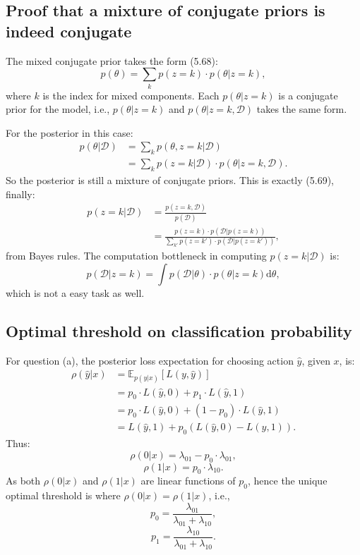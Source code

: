 \documentclass[UTF8]{ctexart}
\begin{document}
\subsection{Proof that a mixture of conjugate priors is indeed conjugate}
The mixed conjugate prior takes the form (5.68):
$$p(\theta)=\sum_{k}p(z=k)\cdot p(\theta|z=k),$$
where $k$ is the index for mixed components.
Each $p(\theta|z=k)$ is a conjugate prior for the model, i.e., $p(\theta|z=k)$ and $p(\theta|z=k,\mathcal{D})$ takes the same form.

For the posterior in this case:
$$
\begin{aligned}
p(\theta|\mathcal{D})&=\sum_{k}p(\theta,z=k|\mathcal{D})\\
&=\sum_{k}p(z=k|\mathcal{D})\cdot p(\theta|z=k,\mathcal{D}).
\end{aligned}
$$
So the posterior is still a mixture of conjugate priors.
This is exactly (5.69), finally:
$$
\begin{aligned}
p(z=k|\mathcal{D})&= \frac{p(z=k,\mathcal{D})}{p(\mathcal{D})}\\
&=\frac{p(z=k)\cdot p(\mathcal{D}|p(z=k))}{\sum_{k'}p(z=k')\cdot p(\mathcal{D}|p(z=k'))},
\end{aligned}
$$
from Bayes rules.
The computation bottleneck in computing $p(z=k|\mathcal{D})$ is:
$$p(\mathcal{D}|z=k)=\int p(\mathcal{D}|\theta)\cdot p(\theta|z=k)\text{d}\theta,$$
which is not a easy task as well.


\subsection{Optimal threshold on classification probability}
For question (a), the posterior loss expectation for choosing action $\hat{y}$, given $x$, is:
$$
\begin{aligned}
\rho(\hat{y}|x)&=\mathbb{E}_{p(y|x)}[L(y,\hat{y})]\\
&=p_{0}\cdot L(\hat{y},0)+p_{1}\cdot L(\hat{y},1)\\
&=p_{0}\cdot  L(\hat{y},0)+(1-p_{0})\cdot L(\hat{y},1)\\
&=L(\hat{y},1)+p_{0}(L(\hat{y},0)-L(\hat{y},1)).
\end{aligned}
$$
Thus:
$$\rho(0|x)=\lambda_{01}-p_{0}\cdot \lambda_{01},$$
$$\rho(1|x)=p_{0}\cdot \lambda_{10}.$$
As both $\rho(0|x)$ and $\rho(1|x)$ are linear functions of $p_{0}$, hence the unique optimal threshold is where $\rho(0|x)=\rho(1|x)$, i.e.,
$$p_{0}=\frac{\lambda_{01}}{\lambda_{01}+\lambda_{10}},$$
$$p_{1}=\frac{\lambda_{10}}{\lambda_{01}+\lambda_{10}}.$$
\end{document}
